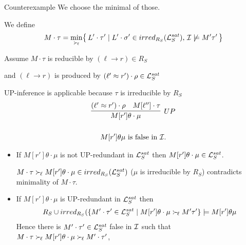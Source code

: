 \documentclass[%
handout,
]{beamer}
\begin{document}
\begin{frame}[allowframebreaks]{Counterexample}
    We choose the minimal of those.

    \framebreak
    We define
    \begin{gather*}
        M\cdot\tau = \min_{\mathrel\succ_{\!\ell}}\!
\left\{\,
    L'\cdot\tau' \mid
    L'\cdot\sigma' \in irred_{R_S}(\mathcal{L}_S^{sat}),\,
    \mathcal{I} \not\models M'\tau'\,
\right\}
    \end{gather*}

Assume $M\cdot\tau$ is reducible by $(\ell\to r)\in R_S$

        and $(\ell\to r)$ is produced by $(\ell'\approx r')\cdot\rho\in\mathcal{L}_S^{sat}$

        \vspace{0.7em}
        UP-inference is applicable because $\tau$ is irreducible by $R_S$
        \begin{gather*}
            \infer[UP]
            {M[r']\theta\cdot\mu}
            {(\ell'\mEQ r')\cdot\rho & M[\ell'']\cdot\tau}
            \\
            \\
            M[r']\theta\mu\text{ is false in } \mcI.
        \end{gather*}


        \framebreak

        \begin{itemize}
            \item If $M[r']\theta\cdot\mu$ is not UP-redundant in $\mathcal{L}_S^{sat}$
            then $M[r']\theta\cdot\mu\in\mathcal{L}_S^{sat}$.

            \vspace{0.7em}
            $M\cdot\tau\mathrel\succ_{\!\ell}
            M[r']\theta\cdot\mu\in irred_{R_S}(\mathcal{L}_S^{sat})$ ($\mu$ is irreducible by $R_S$)
            contradicts minimality of $M\cdot\tau$.


            \vspace{0.7em}
            \item If $M[r']\theta\cdot\mu$ is UP-redundant in $\mathcal{L}_S^{sat}$ then
            \begin{gather*}
                R_S \cup irred_{R_S}(
                \{
                    M'\cdot\tau'\in\mathcal{L}_S^{sat}\mid
                    M[r']\theta\cdot\mu \mathrel\succ_{\!\ell} M'\tau'
                    \} \models M[r']\theta\mu
            \end{gather*}
            Hence there is $M'\cdot\tau'\in\mathcal{L}_S^{sat}$ false in $\mathcal{I}$ such that
            $M\cdot\tau\mathrel\succ_{\!\ell} M[r']\theta\cdot\mu\mathrel\succ_{\!\ell} M'\cdot\tau'$,


\end{itemize}
\end{frame}
\end{document}
